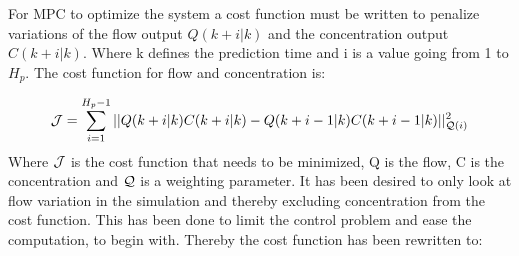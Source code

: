 
For MPC to optimize the system a cost function must be written to penalize variations of the flow output $Q(k+i|k)$ and the concentration output $C(k+i|k)$. Where k defines the prediction time and i is a value going from 1 to $H_p$. The cost function for flow and concentration is:

\begin{equation}
	 \CMcal{J} = \sum_{i=1}^{H_p-1} || Q(k+i|k)C(k+i|k)-Q(k+i-1|k)C(k+i-1|k)||_{\CMcal{Q}(i)}^2
\end{equation}
Where $\CMcal{J}$ is the cost function that needs to be minimized, Q is the flow, C is the concentration and $\CMcal{Q}$ is a weighting parameter. It has been desired to only look at flow variation in the simulation and thereby excluding concentration from the cost function. This has been done to limit the control problem and ease the computation, to begin with. Thereby the cost function has been rewritten to: 


